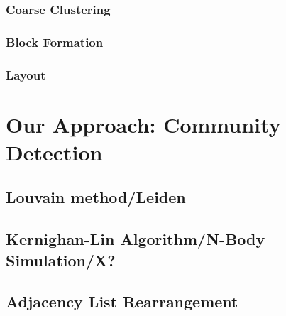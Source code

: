         \subsubsection{Coarse Clustering}\label{\positionnumber}
        \subsubsection{Block Formation}\label{\positionnumber}
        \subsubsection{Layout}\label{\positionnumber}

\section{Our Approach: Community Detection}\label{\positionnumber}
    \subsection{Louvain method/Leiden}\label{\positionnumber}
    \subsection{Kernighan-Lin Algorithm/N-Body Simulation/X?}\label{\positionnumber}
    \subsection{Adjacency List Rearrangement}\label{\positionnumber}
